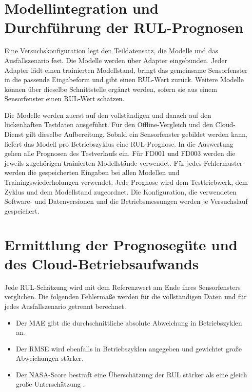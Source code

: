 \section{Modellintegration und Durchführung der RUL-Prognosen}

Eine Versuchskonfiguration legt den Teildatensatz, die Modelle und das Ausfallszenario fest. Die Modelle werden über Adapter eingebunden. Jeder Adapter lädt einen trainierten Modellstand, bringt das gemeinsame Sensorfenster in die passende Eingabeform und gibt einen \ac{RUL}-Wert zurück. Weitere Modelle können über dieselbe Schnittstelle ergänzt werden, sofern sie aus einem Sensorfenster einen \ac{RUL}-Wert schätzen.

Die Modelle werden zuerst auf den vollständigen und danach auf den lückenhaften Testdaten ausgeführt. Für den Offline-Vergleich und den Cloud-Dienst gilt dieselbe Aufbereitung. Sobald ein Sensorfenster gebildet werden kann, liefert das Modell pro Betriebszyklus eine \ac{RUL}-Prognose. In die Auswertung gehen alle Prognosen des Testverlaufs ein. Für FD001 und FD003 werden die jeweils zugehörigen trainierten Modellstände verwendet. Für jedes Fehlermuster werden die gespeicherten Eingaben bei allen Modellen und Trainingswiederholungen verwendet. Jede Prognose wird dem Testtriebwerk, dem Zyklus und dem Modellstand zugeordnet. Die Konfiguration, die verwendeten Software- und Datenversionen und die Betriebsmessungen werden je Versuchslauf gespeichert.

\section{Ermittlung der Prognosegüte und des Cloud-Betriebsaufwands}\label{sec:messgroessen}

Jede \ac{RUL}-Schätzung wird mit dem Referenzwert am Ende ihres Sensorfensters verglichen. Die folgenden Fehlermaße werden für die vollständigen Daten und für jedes Ausfallszenario getrennt berechnet.

\begin{itemize}
    \item Der \ac{MAE} gibt die durchschnittliche absolute Abweichung in Betriebszyklen an.
    \item Der \ac{RMSE} wird ebenfalls in Betriebszyklen angegeben und gewichtet große Abweichungen stärker.
    \item Der \ac{NASA}-Score bestraft eine Überschätzung der \ac{RUL} stärker als eine gleich große Unterschätzung \parencite[7--8]{saxenaDamagePropagationModeling}.
\end{itemize}

